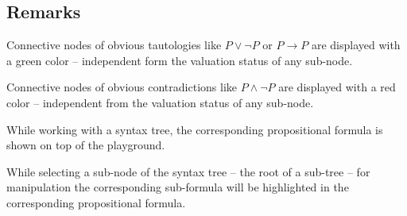 \subsection{Remarks}

Connective nodes of obvious tautologies like
$P \vee \neg P$ or
$P \rightarrow P$ are displayed with a green color – 
independent form the valuation status of any sub-node.

Connective nodes of obvious contradictions like $P \wedge \neg P$ are displayed with a red color – 
independent from the valuation status of any sub-node.

While working with a syntax tree, the corresponding propositional formula is shown on top of the playground.

While selecting a sub-node of the syntax tree – the root of a sub-tree – 
for manipulation the corresponding sub-formula will be highlighted in the corresponding propositional formula.



